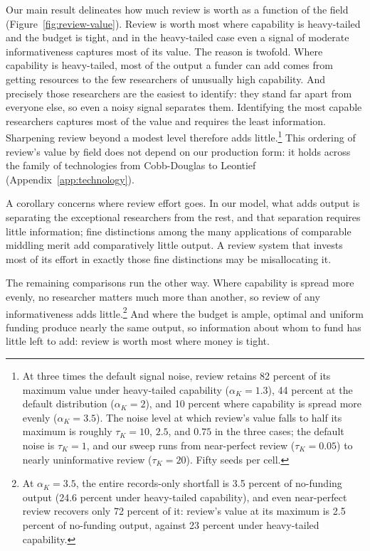 \documentclass[article, 11pt, reqno]{amsart}
\theoremstyle{named}
\begin{document}
Our main result delineates how much review is worth as a function of the field
(Figure~\ref{fig:review-value}). Review is worth most where capability is heavy-tailed
and the budget is tight, and in the heavy-tailed case even a signal of moderate
informativeness captures most of its value. The reason is twofold. Where capability is
heavy-tailed, most of the output a funder can add comes from getting resources to the
few researchers of unusually high capability. And precisely those researchers are the
easiest to identify: they stand far apart from everyone else, so even a noisy signal
separates them. Identifying the most capable researchers captures most of the value and
requires the least information. Sharpening review beyond a modest level therefore adds
little.\footnote{At three times the default signal noise, review retains 82 percent of
its maximum value under heavy-tailed capability ($\alpha_K = 1.3$), 44 percent at the
default distribution ($\alpha_K = 2$), and 10 percent where capability is spread more
evenly ($\alpha_K = 3.5$). The noise level at which review's value falls to half its
maximum is roughly $\tau_K = 10$, $2.5$, and $0.75$ in the three cases; the default
noise is $\tau_K = 1$, and our sweep runs from near-perfect review ($\tau_K = 0.05$) to
nearly uninformative review ($\tau_K = 20$). Fifty seeds per cell.} This ordering of
review's value by field does not depend on our production form: it holds across the
family of technologies from Cobb-Douglas to Leontief (Appendix~\ref{app:technology}).



A corollary concerns where review effort goes. In our model, what adds output is separating
the exceptional researchers from the rest, and that separation requires little
information; fine distinctions among the many applications of comparable middling merit
add comparatively little output. A review system that invests most of its effort in
exactly those fine distinctions may be misallocating it.

The remaining comparisons run the other way. Where capability is spread more evenly, no
researcher matters much more than another, so review of any informativeness adds
little.\footnote{At $\alpha_K = 3.5$, the entire records-only shortfall is 3.5 percent
of no-funding output (24.6 percent under heavy-tailed capability), and even
near-perfect review recovers only 72 percent of it: review's value at its maximum is
2.5 percent of no-funding output, against 23 percent under heavy-tailed capability.}
And where the budget is ample, optimal and uniform funding produce nearly the same
output, so information about whom to fund has little left to add: review is worth most
where money is tight.
\end{document}
